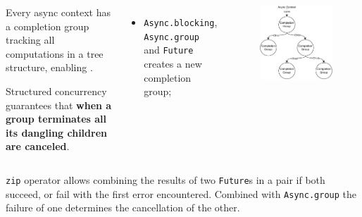\documentclass[aspectratio=1610,xcolor=dvipsnames]{beamer}
\begin{document}
\begin{frame}
  \begin{columns}
      \begin{block}{}
        Every async context has a completion group tracking all computations in a tree structure, enabling . 

        Structured concurrency guarantees that \textbf{when a group terminates all its dangling children are canceled}.
      \end{block}
      \begin{itemize}
        \item \texttt{Async.blocking}, \texttt{Async.group} and \texttt{Future} creates a new completion group;
      \end{itemize}
      \begin{figure}
        \centering
        \includegraphics[width=\textwidth]{./images/structured-concurrency.pdf}
      \end{figure}
  \end{columns}
\end{frame}
%
%
\begin{frame}
  \small
  
  \texttt{zip} operator allows combining the results of two \texttt{Future}s in a pair if both succeed, or fail with the first error encountered. Combined with \texttt{Async.group} the failure of one determines the cancellation of the other.
\end{frame}
\end{document}
